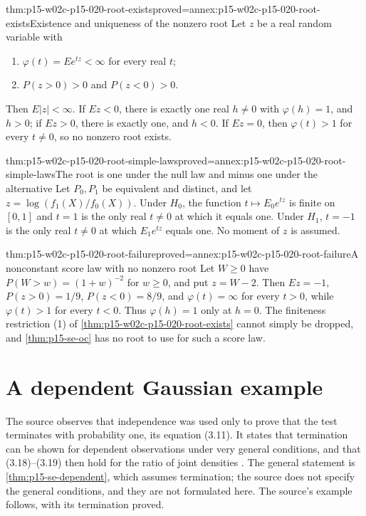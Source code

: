 \begin{hbtheorem}{thm:p15-w02c-p15-020-root-exists}{proved=annex:p15-w02c-p15-020-root-exists}{Existence and uniqueness of the nonzero root}
Let \(z\) be a real random variable with
\begin{enumerate}
\item \(\varphi(t)=Ee^{tz}<\infty\) for every real \(t\);
\item \(P(z>0)>0\) and \(P(z<0)>0\).
\end{enumerate}
Then \(E|z|<\infty\). If \(Ez<0\), there is exactly one real
\(h\neq0\) with \(\varphi(h)=1\), and \(h>0\); if \(Ez>0\), there is
exactly one, and \(h<0\). If \(Ez=0\), then \(\varphi(t)>1\) for every
\(t\neq0\), so no nonzero root exists.
\end{hbtheorem}

\begin{hbtheorem}{thm:p15-w02c-p15-020-root-simple-laws}{proved=annex:p15-w02c-p15-020-root-simple-laws}{The root is one under the null law and minus one under the alternative}
Let \(P_0,P_1\) be equivalent and distinct, and let
\(z=\log(f_1(X)/f_0(X))\). Under \(H_0\), the function
\(t\mapsto E_0e^{tz}\) is finite on \([0,1]\) and \(t=1\) is the only
real \(t\neq0\) at which it equals one. Under \(H_1\), \(t=-1\) is the
only real \(t\neq0\) at which \(E_1e^{tz}\) equals one.
No moment of \(z\) is assumed.
\end{hbtheorem}

\begin{hbtheorem}{thm:p15-w02c-p15-020-root-failure}{proved=annex:p15-w02c-p15-020-root-failure}{A nonconstant score law with no nonzero root}
Let \(W\geq0\) have \(P(W>w)=(1+w)^{-2}\) for \(w\geq0\), and put
\(z=W-2\). Then \(Ez=-1\), \(P(z>0)=1/9\), \(P(z<0)=8/9\), and
\(\varphi(t)=\infty\) for every \(t>0\), while \(\varphi(t)>1\) for
every \(t<0\). Thus \(\varphi(h)=1\) only at \(h=0\). The finiteness
restriction (1) of \cref{thm:p15-w02c-p15-020-root-exists} cannot
simply be dropped, and \cref{thm:p15-se-oc} has no root to use for
such a score law.
\end{hbtheorem}

\section{A dependent Gaussian example}
\label{sec:p15-w02c-p15-020-autoregressive}

The source observes that independence was used only to prove that the
test terminates with probability one, its equation (3.11). It states
that termination can be shown for dependent observations under very
general conditions, and that (3.18)--(3.19) then hold for the ratio of
joint densities \cite[Section 3.2, pp.~128 and 130]{Wald1945SequentialTests}.
The general statement is \cref{thm:p15-se-dependent}, which assumes
termination; the source does not specify the general conditions, and
they are not formulated here. The source's example follows, with its
termination proved.

